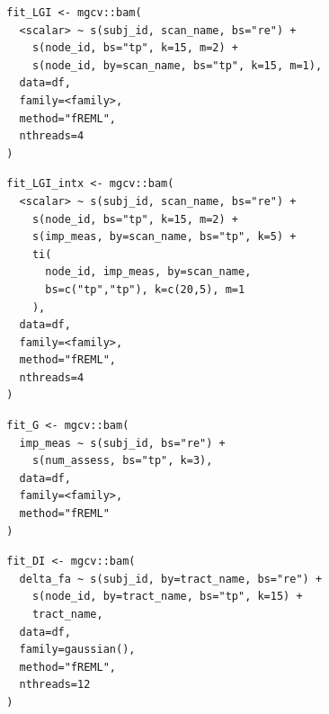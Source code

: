 \documentclass[]{imag-ms-template}
\begin{document}
\begin{equ}[H]
	\begin{lstlisting}
		fit_LGI <- mgcv::bam(
		  <scalar> ~ s(subj_id, scan_name, bs="re") +
		    s(node_id, bs="tp", k=15, m=2) +
		    s(node_id, by=scan_name, bs="tp", k=15, m=1),
		  data=df,
		  family=<family>,
		  method="fREML",
		  nthreads=4
		)
	\end{lstlisting}
	\caption{Tract scalars are modeled as a function of tract node with thin-plate regression splines using both global and group (\lstinline{scan_name}) smooths as well as individual group wiggliness. \lstinline{<scalar>} = relevant DWI metric (AD, RD, MD, or FA), \lstinline{scan_name} = visit identifier factor (Base, Post, RTP), \lstinline{<family>} = relevant family and link function for scalar distribution.}
	\label{supp-code:gam-lgi}
\end{equ}


\begin{equ}[H]
	\begin{lstlisting}
		fit_LGI_intx <- mgcv::bam(
		  <scalar> ~ s(subj_id, scan_name, bs="re") +
		    s(node_id, bs="tp", k=15, m=2) +
		    s(imp_meas, by=scan_name, bs="tp", k=5) +
		    ti(
		      node_id, imp_meas, by=scan_name,
		      bs=c("tp","tp"), k=c(20,5), m=1
		    ),
		  data=df,
		  family=<family>,
		  method="fREML",
		  nthreads=4
		)
	\end{lstlisting}
	\caption{Tract scalars are modeled as a function of separate 1D node and ImPACT smooths as well as a 2D tensor product interaction surface. \lstinline{imp_meas} = ImPACT composite or total symptom measure.}
	\label{supp-code:gam-lgi-intx}
\end{equ}


\begin{equ}[H]
	\begin{lstlisting}
		fit_G <- mgcv::bam(
		  imp_meas ~ s(subj_id, bs="re") +
		    s(num_assess, bs="tp", k=3),
		  data=df,
		  family=<family>,
		  method="fREML"
		)
	\end{lstlisting}
	\caption{ImPACT metrics modeled as a function of number of assessments using a single global smooth. \lstinline{imp_meas} = ImPACT composite or total symptom score, \lstinline{num_assess} = assessment number (1=Base, 2=Post, 3=RTP).}
	\label{supp-code:gam-impact}
\end{equ}


\begin{equ}[H]
	\begin{lstlisting}
		fit_DI <- mgcv::bam(
		  delta_fa ~ s(subj_id, by=tract_name, bs="re") +
		    s(node_id, by=tract_name, bs="tp", k=15) +
		    tract_name,
		  data=df,
		  family=gaussian(),
		  method="fREML",
		  nthreads=12
		)
	\end{lstlisting}
	\caption{Run-Rerun $\Delta$FA values were modeled with node smooths for each tract.}
	\label{supp-code:gam-di}
\end{equ}
\end{document}
